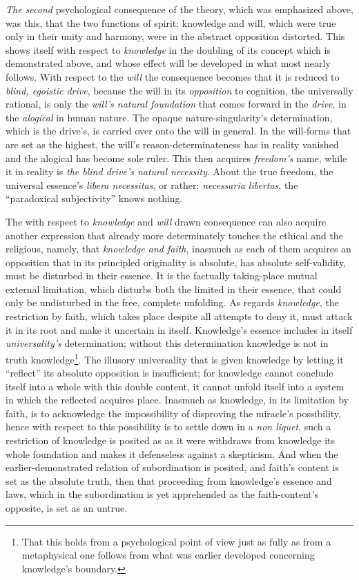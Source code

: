 \documentclass[12pt,a4paper]{book}
\begin{document}
\emph{The second} psychological consequence of the theory, which was emphasized above, was this, that the two functions of spirit:
knowledge and will, which were true only in their unity and harmony, were in the abstract opposition distorted. This shows
itself with respect to \emph{knowledge} in the doubling of its concept which is demonstrated above, and whose effect will be
developed in what most nearly follows. With respect to the \emph{will} the consequence becomes that it is reduced to \emph{blind,
egoistic drive}, because the will in its \emph{opposition} to cognition, the universally rational, is only the \emph{will's natural
foundation} that comes forward in the \emph{drive}, in the \emph{alogical} in human nature. The opaque nature-singularity's determination,
which is the drive's, is carried over onto the will in general. In the will-forms that are set as the highest, the will's
reason-determinateness has in reality vanished and the alogical has become sole ruler. This then acquires \emph{freedom's}
name, while it in reality is \emph{the blind drive's natural necessity}. About the true freedom, the universal essence's
\textit{libera necessitas}, or rather: \textit{necessaria libertas}, the ``paradoxical subjectivity'' knows nothing.

The with respect to \emph{knowledge} and \emph{will} drawn consequence can also acquire another expression that already more determinately
touches the ethical and the religious, namely, that \emph{knowledge and faith}, inasmuch as each of them acquires an opposition that
in its principled originality is absolute, has absolute self-validity, must be disturbed in their essence. It is the
factually taking-place mutual external limitation, which disturbs both the limited in their essence, that could only be
undisturbed in the free, complete unfolding. As regards \emph{knowledge}, the restriction by faith, which takes place despite all
attempts to deny it, must attack it in its root and make it uncertain in itself. Knowledge's essence includes in itself
\emph{universality's} determination; without this determination knowledge is not in truth knowledge\footnote{That this holds
from a psychological point of view just as fully as from a metaphysical one follows from what was earlier developed concerning
knowledge's boundary.}. The illusory universality that is given knowledge by letting it ``reflect'' its absolute opposition is
insufficient; for knowledge cannot conclude itself into a whole with this double content, it cannot unfold itself into a system
in which the reflected acquires place. Inasmuch as knowledge, in its limitation by faith, is to acknowledge the impossibility
of disproving the miracle's possibility, hence with respect to this possibility is to settle down in a \textit{non liquet},
such a restriction of knowledge is posited as as it were withdraws from knowledge its whole foundation and makes it defenseless
against a skepticism. And when the earlier-demonstrated relation of subordination is posited, and faith's content is set as the
absolute truth, then that proceeding from knowledge's essence and laws, which in the subordination is yet apprehended as the
faith-content's opposite, is set as an untrue.
\end{document}
